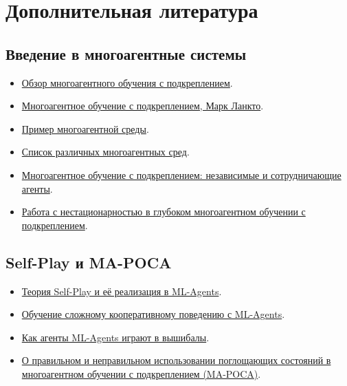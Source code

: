 \documentclass[11pt,a4paper]{article}
\begin{document}
\section{Дополнительная литература}\label{additional-readings}

\subsection{Введение в многоагентные системы}\label{an-introduction-to-multi-agents}

\begin{itemize}
\tightlist
\item
  \href{https://www.dcsc.tudelft.nl/~bdeschutter/pub/rep/10_003.pdf}{Обзор многоагентного обучения с подкреплением}.
\item
  \href{https://rlss.inria.fr/files/2019/07/RLSS_Multiagent.pdf}{Многоагентное обучение с подкреплением, Марк Ланкто}.
\item
  \href{https://www.mathworks.com/help/reinforcement-learning/ug/train-3-agents-for-area-coverage.html?s_eid=PSM_15028}{Пример многоагентной среды}.
\item
  \href{https://agents.inf.ed.ac.uk/blog/multiagent-learning-environments/}{Список различных многоагентных сред}.
\item
  \href{https://bit.ly/3nVK7My}{Многоагентное обучение с подкреплением: независимые и сотрудничающие агенты}.
\item
  \href{https://bit.ly/3v7LxaT}{Работа с нестационарностью в глубоком многоагентном обучении с подкреплением}.
\end{itemize}

\subsection{Self-Play и MA-POCA}\label{self-play-and-ma-poca}

\begin{itemize}
\tightlist
\item
  \href{https://blog.unity.com/technology/training-intelligent-adversaries-using-self-play-with-ml-agents}{Теория Self-Play и её реализация в ML-Agents}.
\item
  \href{https://blog.unity.com/technology/ml-agents-v20-release-now-supports-training-complex-cooperative-behaviors}{Обучение сложному кооперативному поведению с ML-Agents}.
\item
  \href{https://blog.unity.com/technology/ml-agents-plays-dodgeball}{Как агенты ML-Agents играют в вышибалы}.
\item
  \href{https://arxiv.org/pdf/2111.05992.pdf}{О правильном и неправильном использовании поглощающих состояний в многоагентном обучении с подкреплением (MA-POCA)}.
\end{itemize}
\end{document}
